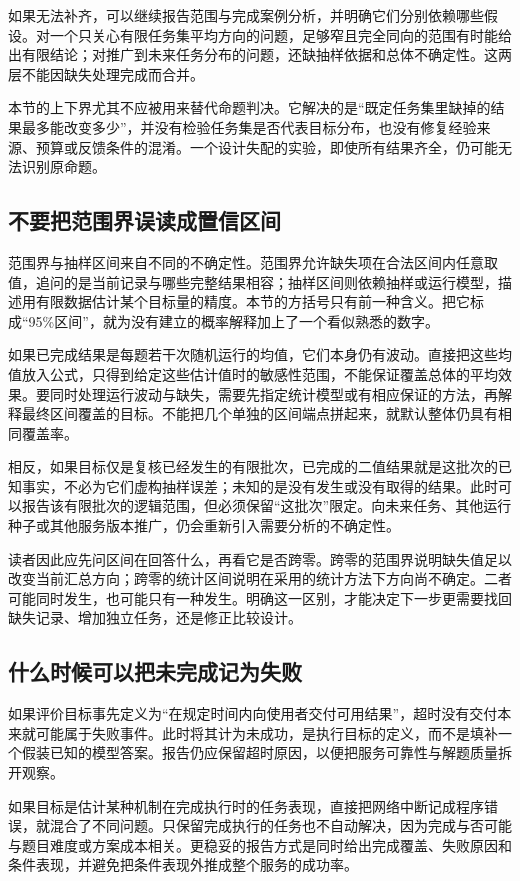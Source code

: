 如果无法补齐，可以继续报告范围与完成案例分析，并明确它们分别依赖哪些假设。对一个只关心有限任务集平均方向的问题，足够窄且完全同向的范围有时能给出有限结论；对推广到未来任务分布的问题，还缺抽样依据和总体不确定性。这两层不能因缺失处理完成而合并。

本节的上下界尤其不应被用来替代命题判决。它解决的是“既定任务集里缺掉的结果最多能改变多少”，并没有检验任务集是否代表目标分布，也没有修复经验来源、预算或反馈条件的混淆。一个设计失配的实验，即使所有结果齐全，仍可能无法识别原命题。


\subsection{不要把范围界误读成置信区间}

范围界与抽样区间来自不同的不确定性。范围界允许缺失项在合法区间内任意取值，追问的是当前记录与哪些完整结果相容；抽样区间则依赖抽样或运行模型，描述用有限数据估计某个目标量的精度。本节的方括号只有前一种含义。把它标成“95\%区间”，就为没有建立的概率解释加上了一个看似熟悉的数字。

如果已完成结果是每题若干次随机运行的均值，它们本身仍有波动。直接把这些均值放入公式，只得到给定这些估计值时的敏感性范围，不能保证覆盖总体的平均效果。要同时处理运行波动与缺失，需要先指定统计模型或有相应保证的方法，再解释最终区间覆盖的目标。不能把几个单独的区间端点拼起来，就默认整体仍具有相同覆盖率。

相反，如果目标仅是复核已经发生的有限批次，已完成的二值结果就是这批次的已知事实，不必为它们虚构抽样误差；未知的是没有发生或没有取得的结果。此时可以报告该有限批次的逻辑范围，但必须保留“这批次”限定。向未来任务、其他运行种子或其他服务版本推广，仍会重新引入需要分析的不确定性。

读者因此应先问区间在回答什么，再看它是否跨零。跨零的范围界说明缺失值足以改变当前汇总方向；跨零的统计区间说明在采用的统计方法下方向尚不确定。二者可能同时发生，也可能只有一种发生。明确这一区别，才能决定下一步更需要找回缺失记录、增加独立任务，还是修正比较设计。

\subsection{什么时候可以把未完成记为失败}

如果评价目标事先定义为“在规定时间内向使用者交付可用结果”，超时没有交付本来就可能属于失败事件。此时将其计为未成功，是执行目标的定义，而不是填补一个假装已知的模型答案。报告仍应保留超时原因，以便把服务可靠性与解题质量拆开观察。

如果目标是估计某种机制在完成执行时的任务表现，直接把网络中断记成程序错误，就混合了不同问题。只保留完成执行的任务也不自动解决，因为完成与否可能与题目难度或方案成本相关。更稳妥的报告方式是同时给出完成覆盖、失败原因和条件表现，并避免把条件表现外推成整个服务的成功率。

